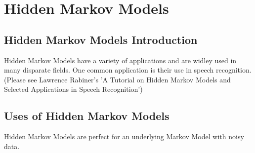 \documentclass[12pt]{report}
\begin{document}

\maketitle

\vspace*{.1in}




\section{Hidden Markov Models}

\subsection{Hidden Markov Models Introduction}
Hidden Markov Models have a variety of applications and are widley used in many disparate fields. One common application is their use
in speech recognition. (Please see Lawrence Rabiner's 'A Tutorial on Hidden Markov Models and Selected Applications in Speech Recognition')

\subsection{Uses of Hidden Markov Models}
Hidden Markov Models are perfect for an underlying Markov Model with noisy data.
\vspace{10 mm}
\newcommand{\HMM}[1][]{
	\begin{tikzpicture}[#1]
	\centering
	\tikzstyle{main}=[circle, minimum size = 10mm, thick, draw =black!80, node distance = 12mm]
	\tikzstyle{connect}=[-latex, thick]
	\node[main, fill = white!100] (Q1) [label=below:$Q_1$] { };
	\node[main] (Q2) [right=of Q1,label=below:$Q_2$] { };
	\node[main] (Q3) [right=of Q2,label=below:$Q_3$] { };
	\node[main] (Q4) [right=of Q3,label=below:$Q_4$] { };
	\node[main, fill = black!10] (O1) [above=of Q1,label=left:$O_1$] { };
	\node[main, fill = black!10] (O2) [above=of Q2,label=left:$O_2$] { };
	\node[main, fill = black!10] (O3) [above=of Q3,label=left:$O_3$] { };
	\node[main, fill = black!10] (O4) [above=of Q4,label=left:$O_4$] { };
	\path (Q1) edge [connect] (Q2)
        (Q2) edge [connect] (Q3)
        (Q3) edge [connect] (Q4)
        (Q1) edge [connect] (O1)
        (Q2) edge [connect] (O2)
        (Q3) edge [connect] (O3)
        (Q4) edge [connect] (O4);
	\end{tikzpicture}}
\end{document}

